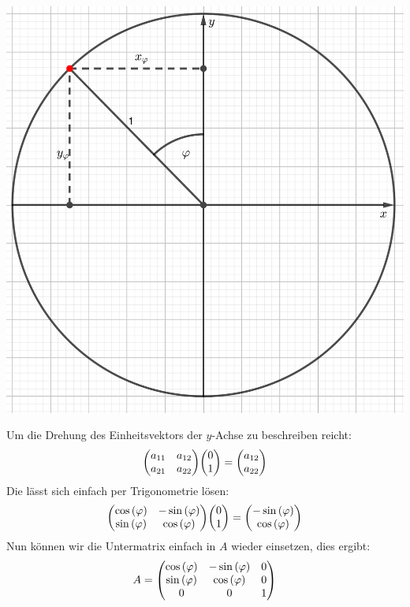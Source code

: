 \documentclass{theozettel}
\begin{document}
\begin{center}
\includegraphics[scale=0.4]{Theo07-4a)_2.pdf}
\end{center}
Um die Drehung des Einheitsvektors der $y$-Achse zu beschreiben reicht:
\begin{align*}
\mqty(a_{11} & a_{12}\\ a_{21} &a_{22})\mqty(0 \\ 1)=\mqty(a_{12}\\ a_{22})
\end{align*}
Die lässt sich einfach per Trigonometrie lösen:
\begin{align*}
\mqty(\cos\left(\varphi\right) & -\sin\left(\varphi\right)\\ \sin\left(\varphi\right) &\cos\left(\varphi\right))\mqty(0 \\ 1)=\mqty(-\sin\left(\varphi\right)\\\cos\left(\varphi\right))
\end{align*}
Nun können wir die Untermatrix einfach in $A$ wieder einsetzen, dies ergibt:
\begin{align*}
A=\mqty(\cos\left(\varphi\right) & -\sin\left(\varphi\right) & 0 \\ \sin\left(\varphi\right) & \cos\left(\varphi\right) & 0\\ 0&0&1)
\end{align*}
\end{document}
